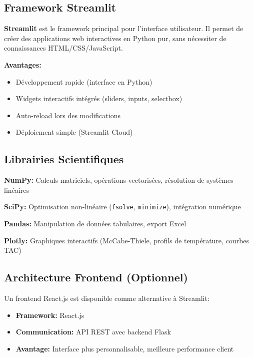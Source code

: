 \documentclass[11pt,a4paper]{article}
\begin{document}
\subsection{Framework Streamlit}

\textbf{Streamlit} est le framework principal pour l'interface utilisateur. Il permet de créer des applications web interactives en Python pur, sans nécessiter de connaissances HTML/CSS/JavaScript.

\textbf{Avantages:}
\begin{itemize}
\item Développement rapide (interface en Python)
\item Widgets interactifs intégrés (sliders, inputs, selectbox)
\item Auto-reload lors des modifications
\item Déploiement simple (Streamlit Cloud)
\end{itemize}

\subsection{Librairies Scientifiques}

\textbf{NumPy:} Calculs matriciels, opérations vectorisées, résolution de systèmes linéaires

\textbf{SciPy:} Optimisation non-linéaire (\texttt{fsolve}, \texttt{minimize}), intégration numérique

\textbf{Pandas:} Manipulation de données tabulaires, export Excel

\textbf{Plotly:} Graphiques interactifs (McCabe-Thiele, profils de température, courbes TAC)

\subsection{Architecture Frontend (Optionnel)}

Un frontend React.js est disponible comme alternative à Streamlit:

\begin{itemize}
\item \textbf{Framework:} React.js
\item \textbf{Communication:} API REST avec backend Flask
\item \textbf{Avantage:} Interface plus personnalisable, meilleure performance client
\end{itemize}

\end{document}
